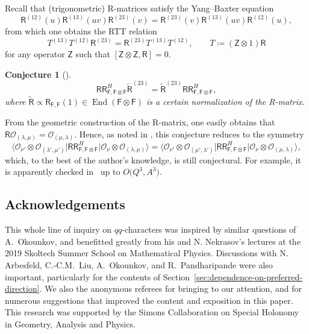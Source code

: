 \documentclass[10pt,a4paper]{amsart}
\numberwithin{equation}{section}
\newtheorem{Conjecture}[Theorem]{Conjecture}
 { \theoremstyle{definition}
\newtheorem{Definition}[Theorem]{Definition}
\newtheorem{Example}[Theorem]{Example}
\newtheorem{Remark}[Theorem]{Remark}
\newtheorem{MyParagraph}{}[subsection]
}
\renewcommand{\tilde}[1]{\widetilde{#1}}
\newcommand{\cO}{\mathcal{O}}
\newcommand{\sF}{\mathsf{F}}
\newcommand{\sZ}{\mathsf{Z}}
\newcommand{\sR}{\mathsf{R}}
\newcommand{\sRR}{\mathsf{RR}}
\DeclareMathOperator{\End}{End}
\begin{document}
\begin{MyParagraph}\label{sec:RR-matrix-YBE}
Recall that (trigonometric) R-matrices satisfy the Yang--Baxter
equation
\[ \sR^{(12)}(u) \sR^{(13)}(uv) \sR^{(23)}(v) = \sR^{(23)}(v) \sR^{(13)}(uv) \sR^{(12)}(u), \]
from which one obtains the RTT relation
\[ T^{(13)} T^{(12)} \sR^{(23)} = \sR^{(23)} T^{(13)} T^{(12)}, \qquad T \coloneqq (\sZ \otimes 1)\sR \]
for any operator $\sZ$ such that $[\sZ \otimes \sZ, \sR] = 0$.

\begin{Conjecture}[{\cite[Section~3]{Awata2016}}]
 \[ \sRR^H_{\sF,\sF \otimes \sF} \tilde \sR^{(23)} = \tilde \sR^{(23)} \sRR^H_{\sF,\sF \otimes \sF}, \]
 where
 $\tilde \sR \propto \sR_{\sF,\sF}(1) \in \End(\sF \otimes \sF)$ is a
 certain normalization of the R-matrix.
\end{Conjecture}

From the geometric construction of the R-matrix, one easily obtains
that $\sR \cO_{(\lambda,\mu)} = \cO_{(\mu,\lambda)}$. Hence, as noted
in \cite{Awata2016}, this conjecture reduces to the symmetry
\begin{equation*}
 \big\langle \cO_{\nu'} \otimes \cO_{(\lambda',\mu')} \big| \sRR^H_{\sF,\sF \otimes \sF} \big| \cO_{\nu} \otimes \cO_{(\lambda,\mu)}\big\rangle = \big\langle\cO_{\nu'} \otimes \cO_{(\mu',\lambda')} \big| \sRR^H_{\sF,\sF \otimes \sF} \big| \cO_{\nu} \otimes \cO_{(\mu,\lambda)}\big\rangle,
\end{equation*}
which, to the best of the author's knowledge, is still conjectural.
For example, it is apparently checked in~\cite{Morozov2016} up to
$O\big(Q^3,A^3\big)$.
\end{MyParagraph}

\subsection*{Acknowledgements}

This whole line of inquiry on $qq$-characters was inspired by similar
questions of A.~Okounkov, and benefitted greatly from his and N.
Nekrasov's lectures at the 2019 Skoltech Summer School on Mathematical
Physics. Discussions with N. Arbesfeld, C.-C.M.~Liu, A.~Okounkov, and
R.~Pandharipande were also important, particularly for the contents of
Section~\ref{sec:dependence-on-preferred-direction}. We also the anonymous
referees for bringing \cite{Fukuda2020} to our attention, and for
numerous suggestions that improved the content and exposition in this
paper.
This research was supported by the Simons Collaboration on Special
Holonomy in Geometry, Analysis and Physics.
\end{document}
